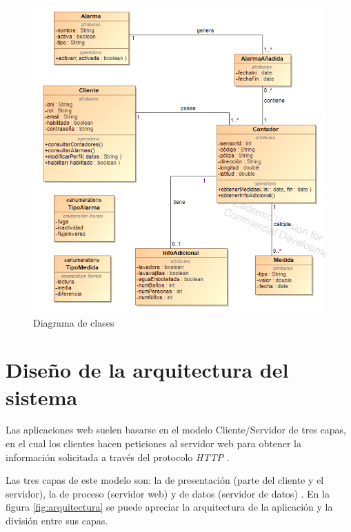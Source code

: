 \documentclass[pdftex,11pt,a4paper]{book}
\begin{document}
 \begin{figure}[H]
 \centering
 \includegraphics [scale=1] {images/diagramas/diagrama-clases.png}
 \caption{Diagrama de clases} \label{fig:diagrama-clases}
 \end{figure}


\section{Diseño de la arquitectura del sistema}

Las aplicaciones web suelen basarse en el modelo Cliente/Servidor de tres capas, en el cual los clientes hacen peticiones al servidor web para obtener la información solicitada a través del protocolo \textit{HTTP} \cite{bib:arquitectura}. 

Las tres capas de este modelo son: la de presentación (parte del cliente y el servidor), la de proceso (servidor web) y de datos (servidor de datos) \cite{bib:arquitectura}. En la figura \ref{fig:arquitectura} se puede apreciar la arquitectura de la aplicación y la división entre sus capas.
\end{document}
